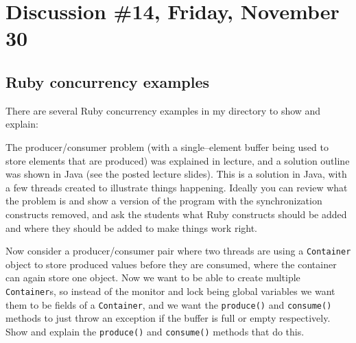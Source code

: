 \documentclass[12pt]{article}
\begin{document}

  \section{Discussion \#14, Friday, November 30}

    \subsection{Ruby concurrency examples}

      There are several Ruby concurrency examples in my directory to show and
    explain:

      \vspace{-.5mm}

      \begin{description}

        \addtolength{\itemsep}{0mm}

        \item[produce--consume.rb:] The producer/consumer problem (with a
              single--element buffer being used to store elements that are
              produced) was explained in lecture, and a solution outline was
              shown in Java (see the posted lecture slides).  This is a
              solution in Java, with a few threads created to illustrate
              things happening.  Ideally you can review what the problem is
              and show a version of the program with the synchronization
              constructs removed, and ask the students what Ruby constructs
              should be added and where they should be added to make things
              work right.


        \item[multithreading1.rb:] Now consider a producer/consumer pair
              where two threads are using a \texttt{Container} object to
              store produced values before they are consumed, where the
              container can again store one object.  Now we want to be able
              to create multiple \texttt{Container}s, so instead of the
              monitor and lock being global variables we want them to be
              fields of a \texttt{Container}, and we want the
              \texttt{produce()} and \texttt{consume()} methods to just
              throw an exception if the buffer is full or empty
              respectively.  Show and explain the \texttt{produce()} and
              \texttt{consume()} methods that do this.


\end{description}
\end{document}
